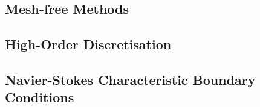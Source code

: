 


\subsection{Mesh-free Methods}

\cite{monaghan1992SmoothedParticleHydrodynamics, vacondio2021GrandChallengesSmoothed}





\subsection{High-Order Discretisation}




\subsection{Navier-Stokes Characteristic Boundary Conditions}

\cite{thompson1987TimeDependentBoundary, thompson1990TimeDependentBoundaryConditions, poinsot1992BoundaryConditionsDirect, poinsot2005TheoreticalNumericalCombustion, sutherland2003ImprovedBoundaryConditions}




